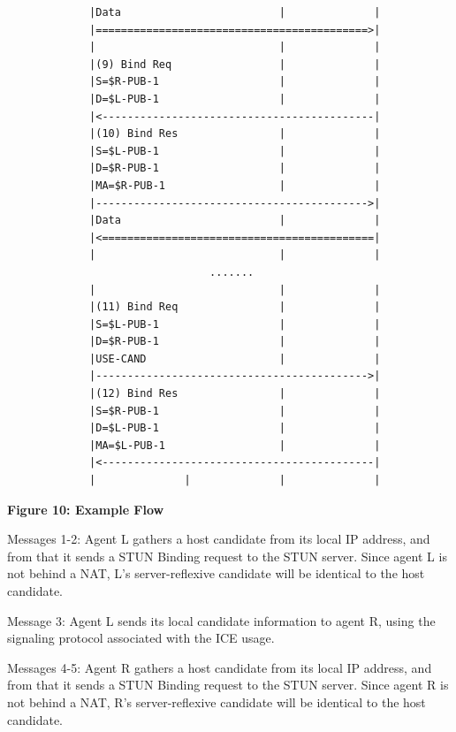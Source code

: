\documentclass{article}
\begin{document}
\begin{verbatim}
             |Data                         |              |
             |===========================================>|
             |                             |              |
             |(9) Bind Req                 |              |
             |S=$R-PUB-1                   |              |
             |D=$L-PUB-1                   |              |
             |<-------------------------------------------|
             |(10) Bind Res                |              |
             |S=$L-PUB-1                   |              |
             |D=$R-PUB-1                   |              |
             |MA=$R-PUB-1                  |              |
             |------------------------------------------->|
             |Data                         |              |
             |<===========================================|
             |                             |              |
                                .......
             |                             |              |
             |(11) Bind Req                |              |
             |S=$L-PUB-1                   |              |
             |D=$R-PUB-1                   |              |
             |USE-CAND                     |              |
             |------------------------------------------->|
             |(12) Bind Res                |              |
             |S=$R-PUB-1                   |              |
             |D=$L-PUB-1                   |              |
             |MA=$L-PUB-1                  |              |
             |<-------------------------------------------|
             |              |              |              |

\end{verbatim}

\begin{center}
\textbf{Figure 10: Example Flow}
\end{center}

Messages 1-2: Agent L gathers a host candidate from its local IP address, and from that it sends a STUN Binding request to the STUN server.  Since agent L is not behind a NAT, L's server-reflexive candidate will be identical to the host candidate.

Message 3: Agent L sends its local candidate information to agent R, using the signaling protocol associated with the ICE usage.

Messages 4-5: Agent R gathers a host candidate from its local IP address, and from that it sends a STUN Binding request to the STUN server.  Since agent R is not behind a NAT, R's server-reflexive candidate will be identical to the host candidate.
\end{document}
